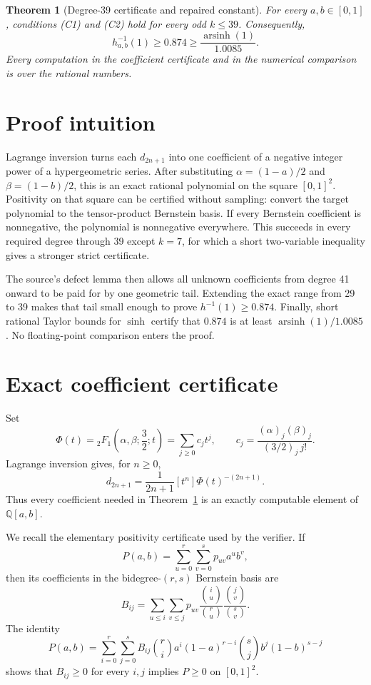 \documentclass[11pt]{article}
\newtheorem{theorem}{Theorem}
\newcommand{\arsinh}{\operatorname{arsinh}}
\newcommand{\Coeff}[2]{[#1^{#2}]}
\begin{document}
\begin{theorem}[Degree-39 certificate and repaired constant]
\label{thm:main}
For every $a,b\in[0,1]$, conditions \emph{(C1)} and \emph{(C2)} hold for
every odd $k\leq39$.  Consequently,
\[
 h_{a,b}^{-1}(1)\geq0.874
 \geq \frac{\arsinh(1)}{1.0085}.                        \tag{1.2}
\]
Every computation in the coefficient certificate and in the numerical
comparison is over the rational numbers.
\end{theorem}

\section{\texorpdfstring{\hspace{0.3em}Proof intuition}{Proof intuition}}

Lagrange inversion turns each $d_{2n+1}$ into one coefficient of a negative
integer power of a hypergeometric series.  After substituting
$\alpha=(1-a)/2$ and $\beta=(1-b)/2$, this is an exact rational polynomial
on the square $[0,1]^2$.  Positivity on that square can be certified without
sampling: convert the target polynomial to the tensor-product Bernstein
basis.  If every Bernstein coefficient is nonnegative, the polynomial is
nonnegative everywhere.  This succeeds in every required degree through 39
except $k=7$, for which a short two-variable inequality gives a stronger
strict certificate.

The source's defect lemma then allows all unknown coefficients from degree 41
onward to be paid for by one geometric tail.  Extending the exact range from
29 to 39 makes that tail small enough to prove $h^{-1}(1)\geq0.874$.
Finally, short rational Taylor bounds for $\sinh$ certify that $0.874$ is at
least $\arsinh(1)/1.0085$.  No floating-point comparison enters the proof.

\section{Exact coefficient certificate}

Set
\[
 \Phi(t)={}_2F_1\!\left(\alpha,\beta;\frac32;t\right)
 =\sum_{j\geq0}c_jt^j,
 \qquad
 c_j=\frac{(\alpha)_j(\beta)_j}{(3/2)_j\,j!}.
\]
Lagrange inversion gives, for $n\geq0$,
\[
 d_{2n+1}=\frac1{2n+1}\Coeff{t}{n}
                  \Phi(t)^{-(2n+1)}.                   \tag{3.1}
\]
Thus every coefficient needed in Theorem~\ref{thm:main} is an exactly
computable element of $\mathbb Q[a,b]$.

We recall the elementary positivity certificate used by the verifier.  If
\[
 P(a,b)=\sum_{u=0}^{r}\sum_{v=0}^{s}p_{uv}a^ub^v,
\]
then its coefficients in the bidegree-$(r,s)$ Bernstein basis are
\[
 B_{ij}=\sum_{u\leq i}\sum_{v\leq j}
 p_{uv}\frac{\binom{i}{u}}{\binom{r}{u}}
       \frac{\binom{j}{v}}{\binom{s}{v}}.               \tag{3.2}
\]
The identity
\[
 P(a,b)=\sum_{i=0}^{r}\sum_{j=0}^{s}B_{ij}
 \binom ri a^i(1-a)^{r-i}\binom sj b^j(1-b)^{s-j}
\]
shows that $B_{ij}\geq0$ for every $i,j$ implies $P\geq0$ on $[0,1]^2$.
\end{document}

